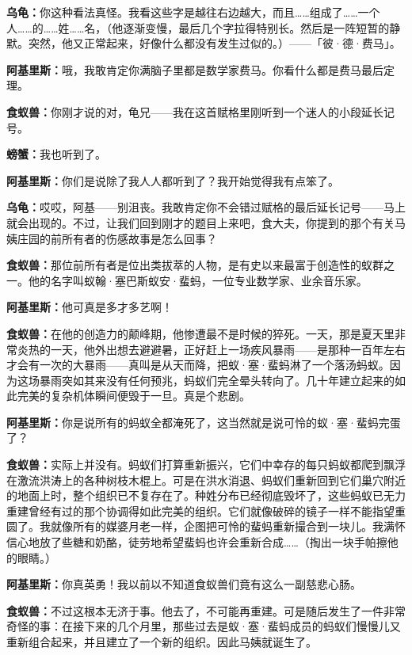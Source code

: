 \documentclass[
  12pt,
  twoside,
  openright,
  oldfontcommands,
]{memoir}
\newcommand{\kaitismall}[1]{{\kaitifamily\small #1}}
\newcommand{\dialogname}[1]{{\heifamily\bfseries #1}}
\begin{document}
\dialogname{乌龟：}你这种看法真怪。我看这些字是越往右边越大，而且\ldots\ldots 组成了\ldots\ldots 一个人\ldots\ldots 的\ldots\ldots 姓\ldots\ldots 名，\kaitismall{（他逐渐变慢，最后几个字拉得特别长。然后是一阵短暂的静默。突然，他又正常起来，好像什么都没有发生过似的。）}------「彼·德·费马」。

\dialogname{阿基里斯：}哦，我敢肯定你满脑子里都是数学家费马。你看什么都是费马最后定理。

\dialogname{食蚁兽：}你刚才说的对，龟兄------我在这首赋格里刚听到一个迷人的小段延长记号。

\dialogname{螃蟹：}我也听到了。

\dialogname{阿基里斯：}你们是说除了我人人都听到了？我开始觉得我有点笨了。

\dialogname{乌龟：}哎哎，阿基------别沮丧。我敢肯定你不会错过赋格的最后延长记号------马上就会出现的。不过，让我们回到刚才的题目上来吧，食大夫，你提到的那个有关马姨庄园的前所有者的伤感故事是怎么回事？

\dialogname{食蚁兽：}那位前所有者是位出类拔萃的人物，是有史以来最富于创造性的蚁群之一。他的名字叫蚁翰·塞巴斯蚁安·蜚蚂，一位专业数学家、业余音乐家。

\dialogname{阿基里斯：}他可真是多才多艺啊！

\dialogname{食蚁兽：}在他的创造力的颠峰期，他惨遭最不是时候的猝死。一天，那是夏天里非常炎热的一天，他外出想去避避暑，正好赶上一场疾风暴雨------是那种一百年左右才会有一次的大暴雨------真叫是从天而降，把蚁·塞·蜚蚂淋了一个落汤蚂蚁。因为这场暴雨突如其来没有任何预兆，蚂蚁们完全晕头转向了。几十年建立起来的如此完美的复杂机体瞬间便毁于一旦。真是个悲剧。

\dialogname{阿基里斯：}你是说所有的蚂蚁全都淹死了，这当然就是说可怜的蚁·塞·蜚蚂完蛋了？

\dialogname{食蚁兽：}实际上并没有。蚂蚁们打算重新振兴，它们中幸存的每只蚂蚁都爬到飘浮在激流洪涛上的各种树枝木棍上。可是在洪水消退、蚂蚁们重新回到它们巢穴附近的地面上时，整个组织已不复存在了。种姓分布已经彻底毁坏了，这些蚂蚁已无力重建曾经有过的那个协调得如此完美的组织。它们就像破碎的镜子一样不能指望重圆了。我就像所有的媒婆月老一样，企图把可怜的蜚蚂重新撮合到一块儿。我满怀信心地放了些糖和奶酪，徒劳地希望蜚蚂也许会重新合成\ldots\ldots{}\kaitismall{（掏出一块手帕擦他的眼睛。）}

\dialogname{阿基里斯：}你真英勇！我以前以不知道食蚁兽们竟有这么一副慈悲心肠。

\dialogname{食蚁兽：}不过这根本无济于事。他去了，不可能再重建。可是随后发生了一件非常奇怪的事：在接下来的几个月里，那些过去是蚁·塞·蜚蚂成员的蚂蚁们慢慢儿又重新组合起来，并且建立了一个新的组织。因此马姨就诞生了。
\end{document}
